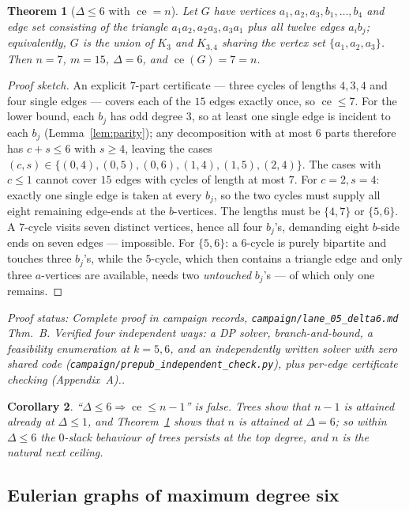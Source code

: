 \documentclass[a4paper,11pt]{amsart}
\newtheorem{theorem}{Theorem}[section]
\newtheorem{corollary}[theorem]{Corollary}
\theoremstyle{definition}
\theoremstyle{remark}
\newcommand{\ce}{\operatorname{ce}}
\newcommand{\proofsrc}[1]{\par\smallskip\noindent\begin{sloppypar}\small\emph{Proof status: #1.}\end{sloppypar}\par\smallskip}
\begin{document}
\begin{theorem}[$\Delta\le6$ with $\ce=n$]\label{thm:counterex}
Let $G$ have vertices $a_1,a_2,a_3,b_1,\dots,b_4$ and edge set consisting of the triangle
$a_1a_2,a_2a_3,a_3a_1$ plus all twelve edges $a_ib_j$; equivalently, $G$ is the union of $K_3$ and
$K_{3,4}$ sharing the vertex set $\{a_1,a_2,a_3\}$. Then $n=7$, $m=15$, $\Delta=6$, and $\ce(G)=7=n$.
\end{theorem}
\begin{proof}[Proof sketch]
An explicit $7$-part certificate --- three cycles of lengths $4,3,4$ and four single edges --- covers each
of the $15$ edges exactly once, so $\ce\le7$. For the lower bound, each $b_j$ has odd degree $3$, so at
least one single edge is incident to each $b_j$ (Lemma~\ref{lem:parity}); any decomposition with at most
$6$ parts therefore has $c+s\le6$ with $s\ge4$, leaving the cases
$(c,s)\in\{(0,4),(0,5),(0,6),(1,4),(1,5),(2,4)\}$. The cases with $c\le1$ cannot cover $15$ edges with
cycles of length at most $7$. For $c=2,s=4$: exactly one single edge is taken at every $b_j$, so the two
cycles must supply all eight remaining edge-ends at the $b$-vertices. The lengths must be $\{4,7\}$ or
$\{5,6\}$. A $7$-cycle visits seven distinct vertices, hence all four $b_j$'s, demanding eight
$b$-side ends on seven edges --- impossible. For $\{5,6\}$: a $6$-cycle is purely bipartite and touches
three $b_j$'s, while the $5$-cycle, which then contains a triangle edge and only three $a$-vertices are
available, needs two \emph{untouched} $b_j$'s --- of which only one remains.
\end{proof}
\proofsrc{Complete proof in campaign records, \texttt{campaign/lane\_05\_delta6.md} Thm.~B. Verified four
independent ways: a DP solver, branch-and-bound, a feasibility enumeration at $k=5,6$, and an independently
written solver with zero shared code (\texttt{campaign/prepub\_independent\_check.py}), plus per-edge
certificate checking (Appendix~A).}

\begin{corollary}\label{cor:d6fail}
``$\Delta\le6\Rightarrow\ce\le n-1$'' is false. Trees show that $n-1$ is attained already at $\Delta\le1$,
and Theorem~\ref{thm:counterex} shows that $n$ is attained at $\Delta=6$; so within $\Delta\le6$ the
$0$-slack behaviour of trees persists at the top degree, and $n$ is the natural next ceiling.
\end{corollary}

\subsection{Eulerian graphs of maximum degree six}
\end{document}
